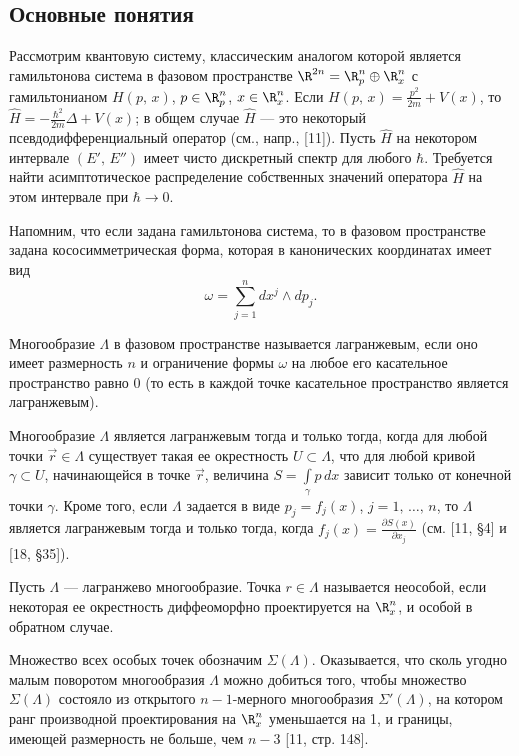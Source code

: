 \documentclass[a4paper
]{article}
\begin{document}
\subsection{Основные понятия}
Рассмотрим квантовую систему, классическим аналогом которой является
гамильтонова система в фазовом пространстве $\R^{2n}=\R^n_p\oplus \R^n_x$
с гамильтонианом $H(p, \, x)$, $p\in \R^n_p$, $x\in \R^n_x$. Если
$H(p, \, x)=\frac{p^2}{2m}+V(x)$, то $\hat H=-\frac{\hbar^2}{2m}\Delta+
V(x)$; в общем случае $\hat H$ --- это некоторый псевдодифференциальный
оператор (см., напр., [11]). Пусть $\hat H$ на некотором интервале
$(E', \, E'')$ имеет чисто дискретный спектр для любого $\hbar$.
Требуется найти асимптотическое распределение собственных значений
оператора $\hat H$ на этом интервале при $\hbar \rightarrow 0$. \par
Напомним, что если задана гамильтонова система, то в фазовом
пространстве задана кососимметрическая форма, которая в канонических
координатах имеет вид $$\omega=\sum \limits_{j=1}^n dx^j\wedge dp_j.$$
\begin{Def}
Многообразие $\Lambda$ в фазовом пространстве называется лагранжевым,
если оно имеет размерность $n$ и ограничение формы $\omega$ на
любое его касательное пространство равно 0 (то есть
в каждой точке касательное пространство является лагранжевым).
\end{Def}
Многообразие $\Lambda$ является лагранжевым тогда и только тогда,
когда для любой точки $\vec r\in \Lambda$ существует такая ее окрестность
$U\subset \Lambda$, что для любой кривой $\gamma \subset U$,
начинающейся в точке $\vec r$, величина $S=\int \limits_\gamma p\, dx$
зависит только от конечной точки $\gamma$. Кроме того, если $\Lambda$
задается в виде $p_j=f_j(x)$, $j=1, \, \dots, \, n$, то $\Lambda$
является лагранжевым тогда и только тогда, когда $f_j(x)=\frac{\partial
S(x)}{\partial x_j}$ (см. [11, \S 4] и [18, \S 35]).
\begin{Def}
Пусть $\Lambda$ --- лагранжево многообразие. Точка $r\in \Lambda$
называется неособой, если некоторая ее окрестность диффеоморфно
проектируется на $\R^n_x$, и особой в обратном случае.
\end{Def}
Множество всех особых точек обозначим $\Sigma(\Lambda)$. Оказывается,
что сколь угодно малым поворотом многообразия $\Lambda$ можно
добиться того, чтобы множество $\Sigma(\Lambda)$ состояло из
открытого $n-1$-мерного многообразия $\Sigma'(\Lambda)$, на котором
ранг производной проектирования на $\R^n_x$ уменьшается на 1, и границы,
имеющей размерность не больше, чем $n-3$ [11, стр. 148]. \par
\end{document}

